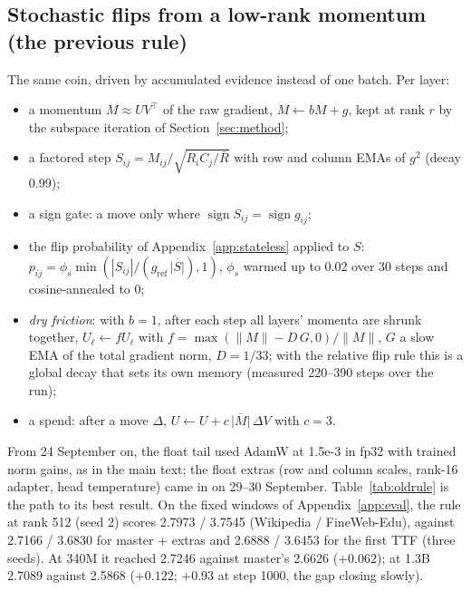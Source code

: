 \documentclass[10pt,twocolumn]{article}
\newcommand{\sign}{\operatorname{sign}}
\begin{document}
\subsection{Stochastic flips from a low-rank momentum (the previous rule)}\label{app:oldrule}
The same coin, driven by accumulated evidence instead of one batch. Per layer:
\begin{itemize}
\item a momentum $M\approx UV^\top$ of the raw gradient, $M\leftarrow bM+g$, kept at rank $r$ by the subspace iteration
  of Section~\ref{sec:method};
\item a factored step $S_{ij}=M_{ij}/\sqrt{R_iC_j/\bar R}$ with row and column EMAs of $g^2$ (decay 0.99);
\item a sign gate: a move only where $\sign S_{ij}=\sign g_{ij}$;
\item the flip probability of Appendix~\ref{app:stateless} applied to $S$: $p_{ij}=\phi_s\min(|S_{ij}|/(g_{\text{ref}}\,
  \overline{|S|}),1)$, $\phi_s$ warmed up to 0.02 over 30 steps and cosine-annealed to 0;
\item \emph{dry friction}: with $b=1$, after each step all layers' momenta are shrunk together, $U_\ell\leftarrow fU_\ell$
  with $f=\max(\|M\|-D\,G,0)/\|M\|$, $G$ a slow EMA of the total gradient norm, $D=1/33$; with the relative flip rule
  this is a global decay that sets its own memory (measured 220--390 steps over the run);
\item a spend: after a move $\Delta$, $U\leftarrow U+c\,\overline{|M|}\,\Delta V$ with $c=3$.
\end{itemize}
From 24 September on, the float tail used AdamW at 1.5e-3 in fp32 with trained norm gains, as in the main text; the
float extras (row and column scales, rank-16 adapter, head temperature) came in on 29--30 September.
Table~\ref{tab:oldrule} is the path to its best result. On the fixed windows of Appendix~\ref{app:eval}, the rule at
rank 512 (seed 2) scores 2.7973 / 3.7545 (Wikipedia / FineWeb-Edu), against 2.7166 / 3.6830 for master + extras and
2.6888 / 3.6453 for the first TTF (three seeds). At 340M it reached 2.7246 against master's 2.6626 ($+0.062$); at 1.3B
2.7089 against 2.5868 ($+0.122$; $+0.93$ at step 1000, the gap closing slowly).
\end{document}
